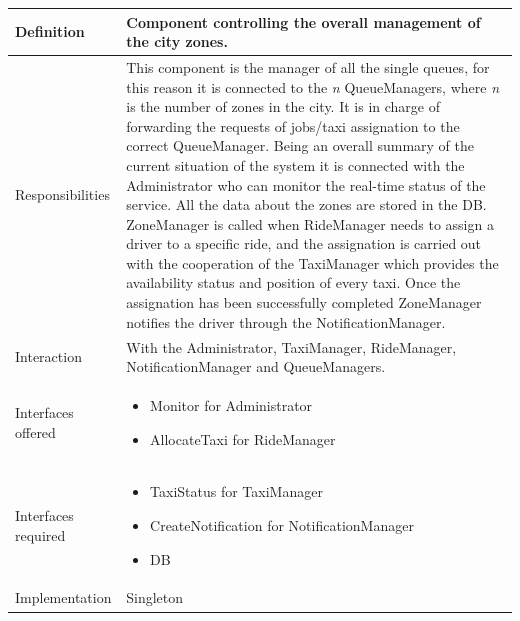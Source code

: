 \documentclass[a4paper,11pt]{report} %
\begin{document}
	\begin{center}
		\begin{tabular}{| l | p{9cm} |}\hline
			Definition & Component controlling the overall management of the city zones.\\\hline
			Responsibilities & This component is the manager of all the single queues, for this reason it is connected to the \textit{n} QueueManagers, where \textit{n} is the number of zones in the city. It is in charge of forwarding the requests of jobs/taxi assignation to the correct QueueManager. Being an overall summary of the current situation of the system it is connected with the Administrator who can monitor the real-time status of the service. All the data about the zones are stored in the DB. ZoneManager is called when RideManager needs to assign a driver to a specific ride, and the assignation is carried out with the cooperation of the TaxiManager which provides the availability status and position of every taxi. Once the assignation has been successfully completed ZoneManager notifies the driver through the NotificationManager.\\\hline
			Interaction & With the Administrator, TaxiManager, RideManager, NotificationManager and QueueManagers.\\\hline
			Interfaces offered & \begin{itemize}
				\item Monitor for Administrator
				\item AllocateTaxi for RideManager
			\end{itemize}\\\hline
			Interfaces required & \begin{itemize}
				\item TaxiStatus for TaxiManager
				\item CreateNotification for NotificationManager
				\item DB
			\end{itemize}\\\hline
			Implementation & Singleton\\\hline
		\end{tabular}
	\end{center}
	
\end{document}
